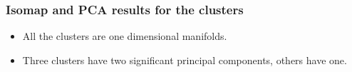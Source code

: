\documentclass[svgnames, table, smaller]{beamer}
\begin{document}
\begin{frame}

  \frametitle{Isomap and PCA results for the clusters}
  
  \begin{itemize}
  \item All the clusters are one dimensional manifolds.
  \item Three clusters have two significant principal components, others
    have one.
  \end{itemize}

  \begin{figure}[ht]
    \begin{center}
      \label{wbeampareto}
    \end{center}
  \end{figure}
\end{frame}
\end{document}

